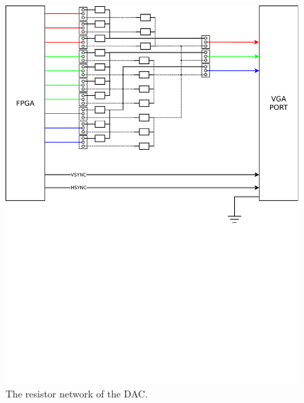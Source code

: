 \begin{figure}[h!]
\centering
\includegraphics[width=\linewidth,clip,trim=0 11cm 0 0]
                {fig/fpga/vga-circuit.pdf}
\caption[VGA controller]
        {The resistor network of the DAC.}
\label{fig:vga-circuit}
\end{figure}

